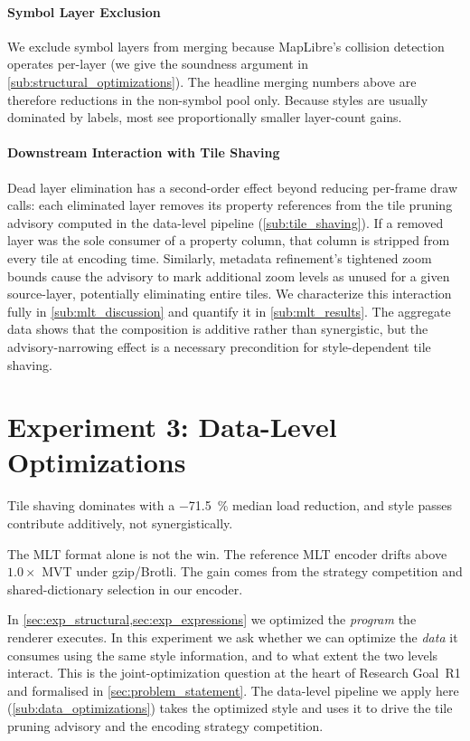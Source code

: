 \paragraph{Symbol Layer Exclusion}
We exclude symbol layers from merging because MapLibre's collision detection operates per-layer (we give the soundness argument in \cref{sub:structural_optimizations}).
The headline merging numbers above are therefore reductions in the non-symbol pool only.
Because styles are usually dominated by labels, most see proportionally smaller layer-count gains.

\paragraph{Downstream Interaction with Tile Shaving}
Dead layer elimination has a second-order effect beyond reducing per-frame draw calls:
each eliminated layer removes its property references from the tile pruning advisory computed in the data-level pipeline (\cref{sub:tile_shaving}).
If a removed layer was the sole consumer of a property column, that column is stripped from every tile at encoding time.
Similarly, metadata refinement's tightened zoom bounds cause the advisory to mark additional zoom levels as unused for a given source-layer, potentially eliminating entire tiles.
We characterize this interaction fully in \cref{sub:mlt_discussion} and quantify it in \cref{sub:mlt_results}.
The aggregate data shows that the composition is additive rather than synergistic, but the advisory-narrowing effect is a necessary precondition for style-dependent tile shaving.


\section{Experiment 3: Data-Level Optimizations}\label{sec:exp_mlt}
\begin{keytakeaways}
\item Tile shaving dominates with a \qty{-71.5}{\percent} median load reduction, and style passes contribute additively, not synergistically.
\item The \ac{MLT} format alone is not the win.
The reference \ac{MLT} encoder drifts above $1.0\times$ \ac{MVT} under gzip/Brotli.\newline
    The gain comes from the strategy competition and shared-dictionary selection in our encoder.
\end{keytakeaways}

\noindent In \cref{sec:exp_structural,sec:exp_expressions} we optimized the \emph{program} the renderer executes.
In this experiment we ask whether we can optimize the \emph{data} it consumes using the same style information, and to what extent the two levels interact.
This is the joint-optimization question at the heart of Research Goal~R1 and formalised in \cref{sec:problem_statement}.
The data-level pipeline we apply here (\cref{sub:data_optimizations}) takes the optimized style and uses it to drive the tile pruning advisory and the encoding strategy competition.

